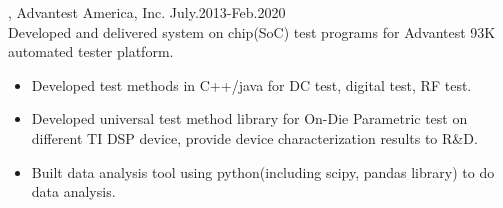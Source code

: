 \documentclass[11pt]{article} %
\begin{document}
, Advantest America, Inc. July.2013-Feb.2020\\
\noindent Developed and delivered system on chip(SoC) test programs for Advantest 93K automated tester platform.\\ 
\begin{itemize}
  
    \item Developed test methods in C++/java for DC test, digital test, RF test.\\
 \vspace{-4mm}
    \item  Developed universal test method library for On-Die Parametric test on different TI DSP device, provide device characterization results to R\&D.\\ 
 
  \vspace{-4mm}
 \item  Built data analysis tool using python(including scipy, pandas library) to do data analysis.\\

  
 \end{itemize}
\vspace{1mm}
\end{document}
